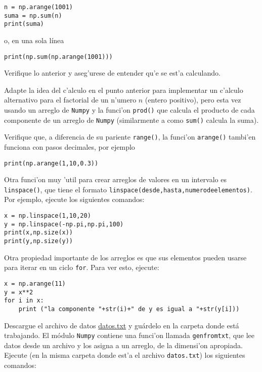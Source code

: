\documentclass[11pt]{exam}
\begin{document}
\begin{questions}
\begin{verbatim}
n = np.arange(1001)
suma = np.sum(n)
print(suma)
\end{verbatim}

o, en una sola línea

\begin{verbatim}
print(np.sum(np.arange(1001)))
\end{verbatim}

Verifique lo anterior y aseg'urese de entender qu'e se est'a calculando.

\item Adapte la idea del c'alculo en el punto anterior para implementar un c'alculo alternativo para el factorial de un n'umero $n$ (entero positivo), pero esta vez usando un arreglo de \texttt{Numpy} y la funci'on \texttt{prod()} que calcula el producto de cada componente de un arreglo de \texttt{Numpy} (similarmente a como \texttt{sum()} calcula la suma).

\item Verifique que, a diferencia de su pariente \texttt{range()}, la funci'on \texttt{arange()} tambi'en funciona con pasos decimales, por ejemplo

\begin{verbatim}
print(np.arange(1,10,0.3))
\end{verbatim}

\item Otra funci'on muy 'util para crear arreglos de valores en un intervalo es \texttt{linspace()}, que tiene el formato \texttt{linspace(desde,hasta,numerodeelementos)}. Por ejemplo, ejecute los siguientes comandos:

\begin{verbatim}
x = np.linspace(1,10,20)
y = np.linspace(-np.pi,np.pi,100)
print(x,np.size(x))
print(y,np.size(y))
\end{verbatim}

\item Otra propiedad importante de los arreglos es que sus elementos pueden usarse para iterar en un ciclo \texttt{for}. Para ver esto, ejecute:

\begin{verbatim}
x = np.arange(11)
y = x**2
for i in x:
	print ("la componente "+str(i)+" de y es igual a "+str(y[i]))
\end{verbatim}

\item Descargue el archivo de datos \href{https://raw.githubusercontent.com/gfrubi/CC/master/guias/14/datos.txt}{datos.txt} y guárdelo en la carpeta donde está trabajando. El módulo \texttt{Numpy} contiene una funci'on llamada \texttt{genfromtxt}, que lee datos desde un archivo y los asigna a un arreglo, de la dimensi'on apropiada. Ejecute (en la misma carpeta donde est'a el archivo \texttt{datos.txt}) los siguientes comandos:


\end{questions}
\end{document}
